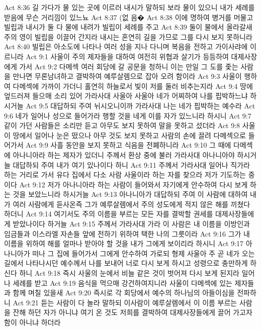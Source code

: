 Act 8:36  길 가다가 물 있는 곳에 이르러 내시가 말하되 보라 물이 있으니 내가 세례를 받음에 무슨 거리낌이 있느뇨
Act 8:37  (없 음�
Act 8:38  이에 명하여 병거를 머물고 빌립과 내시가 둘 다 물에 내려가 빌립이 세례를 주고
Act 8:39  둘이 물에서 올라갈새 주의 영이 빌립을 이끌어 간지라 내시는 혼연히 길을 가므로 그를 다시 보지 못하니라
Act 8:40  빌립은 아소도에 나타나 여러 성을 지나 다니며 복음을 전하고 가이사랴에 이르니라
Act 9:1  사울이 주의 제자들을 대하여 여전히 위협과 살기가 등등하여 대제사장에게 가서
Act 9:2  다메섹 여러 회당에 갈 공문을 청하니 이는 만일 그 도를 좇는 사람을 만나면 무론남녀하고 결박하여 예루살렘으로 잡아 오려 함이라
Act 9:3  사울이 행하여 다메섹에 가까이 가더니 홀연히 하늘로서 빛이 저를 둘러 비추는지라
Act 9:4  땅에 엎드러져 들으매 소리 있어 가라사대 사울아 사울아 네가 어찌하여 나를 핍박하느냐 하시거늘
Act 9:5  대답하되 주여 뉘시오니이까 가라사대 나는 네가 핍박하는 예수라
Act 9:6  네가 일어나 성으로 들어가라 행할 것을 네게 이를 자가 있느니라 하시니
Act 9:7  같이 가던 사람들은 소리만 듣고 아무도 보지 못하여 말을 못하고 섰더라
Act 9:8  사울이 땅에서 일어나 눈은 떴으나 아무 것도 보지 못하고 사람의 손에 끌려 다메섹으로 들어가서
Act 9:9  사흘 동안을 보지 못하고 식음을 전폐하니라
Act 9:10  그 때에 다메섹에 아나니아라 하는 제자가 있더니 주께서 환상 중에 불러 가라사대 아나니아야 하시거늘 대답하되 주여 내가 여기 있나이다 하니
Act 9:11  주께서 가라사대 일어나 직가라 하는 거리로 가서 유다 집에서 다소 사람 사울이라 하는 자를 찾으라 저가 기도하는 중이다
Act 9:12  저가 아나니아라 하는 사람이 들어와서 자기에게 안수하여 다시 보게 하는 것을 보았느니라 하시거늘
Act 9:13  아나니아가 대답하되 주여 이 사람에 대하여 내가 여러 사람에게 듣사온즉 그가 예루살렘에서 주의 성도에게 적지 않은 해를 끼쳤다 하더니
Act 9:14  여기서도 주의 이름을 부르는 모든 자를 결박할 권세를 대제사장들에게 받았나이다 하거늘
Act 9:15  주께서 가라사대 가라 이 사람은 내 이름을 이방인과 임금들과 이스라엘 자손들 앞에 전하기 위하여 택한 나의 그릇이라
Act 9:16  그가 내 이름을 위하여 해를 얼마나 받아야 할 것을 내가 그에게 보이리라 하시니
Act 9:17  아나니아가 떠나 그 집에 들어가서 그에게 안수하여 가로되 형제 사울아 주 곧 네가 오는 길에서 나타나시던 예수께서 나를 보내어 너로 다시 보게 하시고 성령으로 충만하게 하신다 하니
Act 9:18  즉시 사울의 눈에서 비늘 같은 것이 벗어져 다시 보게 된지라 일어나 세례를 받고
Act 9:19  음식을 먹으매 강건하여지니라 사울이 다메섹에 있는 제자들과 함께 며칠 있을새
Act 9:20  즉시로 각 회당에서 예수의 하나님의 아들이심을 전파하니
Act 9:21  듣는 사람이 다 놀라 말하되 이사람이 예루살렘에서 이 이름 부르는 사람을 잔해 하던 자가 아니냐 여기 온 것도 저희를 결박하여 대제사장들에게 끌어 가고자 함이 아니냐 하더라
